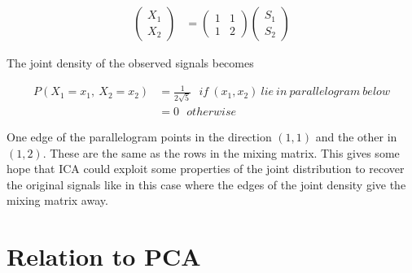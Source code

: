 \documentclass[11pt, a4paper]{article}
\begin{document}
\begin{align*}
	\begin{pmatrix} 
	X_1 \\ 
	X_2 
	\end{pmatrix} & = 
	\begin{pmatrix} 
	1             & 1 \\ 
	1             & 2 
	\end{pmatrix}
	\begin{pmatrix} 
	S_1 \\ 
	S_2
	\end{pmatrix}
\end{align*}

The joint density of the observed signals becomes

\begin{align*}
	P(X_1=x_1,\ X_2=x_2) & = \frac{1}{2\sqrt{5}}\ \ \ if\ (x_1, x_2)\ lie\ in\  parallelogram\ below \\
	                     & = 0\ \ \ otherwise                                                        
\end{align*}


\begin{figure}[htbp]
	\centering
\end{figure}

\FloatBarrier

One edge of the parallelogram points in the direction $(1, 1)$ and the other in $(1, 2)$. These are the same as the rows in the mixing matrix. This gives some hope that ICA could exploit some properties of the joint distribution to recover the original signals like in this case where the edges of the joint density give the mixing matrix away. 

\section{Relation to PCA}
\end{document}
